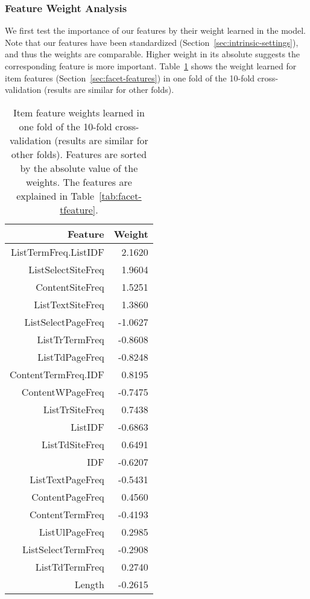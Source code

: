 \subsubsection{Feature Weight Analysis}
We first test the importance of our features by their weight learned in the model. Note that our features have been standardized (Section~\ref{sec:intrinsic-settings}), and thus the weights are comparable. Higher weight in its absolute suggests the corresponding feature is more important. Table~\ref{tab:intrinsic-tanalysis} shows the weight learned for item features (Section~\ref{sec:facet-features}) in one fold of the 10-fold cross-validation (results are similar for other folds).
\begin{table}[!ht]
\centering
\caption{Item feature weights learned in one fold of the 10-fold cross-validation (results are similar for other folds). Features are sorted by the absolute value of the weights. The features are explained in Table~\ref{tab:facet-tfeature}.}
\label{tab:intrinsic-tanalysis}
\begin{tabular}{|r|r|} \hline
Feature & Weight \\ \hline
ListTermFreq.ListIDF & 2.1620 \\ \hline
ListSelectSiteFreq & 1.9604 \\ \hline
ContentSiteFreq & 1.5251 \\ \hline
ListTextSiteFreq & 1.3860 \\ \hline
ListSelectPageFreq & -1.0627 \\ \hline
ListTrTermFreq & -0.8608 \\ \hline
ListTdPageFreq & -0.8248 \\ \hline
ContentTermFreq.IDF & 0.8195 \\ \hline
ContentWPageFreq & -0.7475 \\ \hline
ListTrSiteFreq & 0.7438 \\ \hline
ListIDF & -0.6863 \\ \hline
ListTdSiteFreq & 0.6491 \\ \hline
IDF & -0.6207 \\ \hline
ListTextPageFreq & -0.5431 \\ \hline
ContentPageFreq & 0.4560 \\ \hline
ContentTermFreq & -0.4193 \\ \hline
ListUlPageFreq & 0.2985 \\ \hline
ListSelectTermFreq & -0.2908 \\ \hline
ListTdTermFreq & 0.2740 \\ \hline
Length & -0.2615 \\ \hline

\end{tabular}
\end{table}
